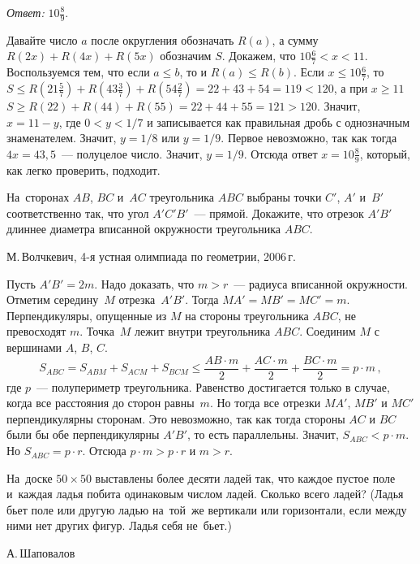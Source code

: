 \ifincludesolutions
\emph{Ответ:} $10 \frac{8}{9}$.
\par
Давайте число $a$ после округления обозначать $R(a)$, а сумму
$R(2 x) + R(4 x) + R(5 x)$ обозначим $S$.
Докажем, что $10 \frac{6}{7} < x < 11$.
Воспользуемся тем, что если $a \leq b$, то и $R(a) \leq R(b)$.
Если $x \leq 10 \frac{6}{7}$,
то \(
    S
\leq
    R(21 \frac{5}{7}) + R(43\frac{3}{7}) + R(54 \frac{2}{7})
=
    22 + 43 + 54
=
    119
<
    120
\), а при $x \geq 11$
\(
    S
\geq
    R(22) + R(44) + R(55)
=
    22 + 44 + 55
=
    121 > 120
\).
Значит, $x = 11 - y$, где $0 < y < 1 / 7$ и записывается как правильная дробь
с однозначным знаменателем.
Значит, $y = 1 / 8$ или $y = 1 / 9$.
Первое невозможно, так как тогда $4 x = 43{,}5$~--- полуцелое число.
Значит, $y = 1 / 9$.
Отсюда ответ $x = 10 \frac{8}{9}$, который, как легко проверить, подходит.
\fi %

\begin{problems}

\item
На~сторонах $AB$, $BC$ и~$AC$ треугольника $ABC$ выбраны
точки $C'$, $A'$ и~$B'$ соответственно так, что угол $A'C'B'$~--- прямой.
Докажите, что отрезок $A'B'$ длиннее диаметра вписанной окружности
треугольника $ABC$.
\begin{problem-source}
    М.\,Волчкевич, 4-я устная олимпиада по геометрии, 2006\,г.
\end{problem-source}
\end{problems}

\ifincludesolutions
Пусть $A'B' = 2 m$.
Надо доказать, что $m > r$~--- радиуса вписанной окружности.
Отметим середину~$M$ отрезка~$A'B'$.
Тогда $MA' = MB' = MC' = m$.
Перпендикуляры, опущенные из $M$ на стороны треугольника $ABC$,
не превосходят $m$.
Точка~$M$ лежит внутри треугольника $ABC$.
Соединим $M$ с вершинами $A$, $B$, $C$.
\[
    S_{ABC}
=
    S_{ABM} + S_{ACM} + S_{BCM}
\leq
    \frac{AB \cdot m}{2}
    +
    \frac{AC \cdot m}{2}
    +
    \frac{BC \cdot m}{2}
=
    p \cdot m
\,,\]
где $p$~--- полупериметр треугольника.
Равенство достигается только в случае, когда все расстояния до сторон
равны~$m$.
Но тогда все отрезки $MA'$, $MB'$ и $MC'$ перпендикулярны сторонам.
Это невозможно, так как тогда стороны $AC$ и $BC$ были бы обе перпендикулярны
$A'B'$, то есть параллельны.
Значит, $S_{ABC} < p \cdot m$.
Но $S_{ABC} = p \cdot r$.
Отсюда $p \cdot m > p \cdot r$ и $m > r$.
\fi %

\begin{problems}

\item
На~доске $50 \times 50$ выставлены более десяти ладей так, что каждое пустое
поле и~каждая ладья побита одинаковым числом ладей.
Сколько всего ладей?
(Ладья бьет поле или другую ладью на~той~же вертикали или горизонтали, если
между ними нет других фигур.
Ладья себя не~бьет.)
\begin{problem-source}
    А.\,Шаповалов
\end{problem-source}
\end{problems}

